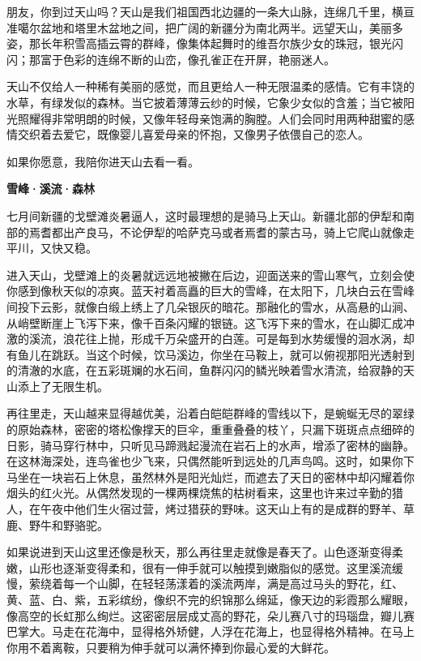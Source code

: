 \documentclass[12pt,UTF-8,openany]{ctexbook}
\begin{document}
\begin{large}
    
    朋友，你到过天山吗？天山是我们祖国西北边疆的一条大山脉，连绵几千里，横亘准噶尔盆地和塔里木盆地之间，把广阔的新疆分为南北两半。远望天山，美丽多姿，那长年积雪高插云霄的群峰，像集体起舞时的维吾尔族少女的珠冠，银光闪闪；那富于色彩的连绵不断的山峦，像孔雀正在开屏，艳丽迷人。
    
    天山不仅给人一种稀有美丽的感觉，而且更给人一种无限温柔的感情。它有丰饶的水草，有绿发似的森林。当它披着薄薄云纱的时候，它象少女似的含羞；当它被阳光照耀得非常明朗的时候，又像年轻母亲饱满的胸膛。人们会同时用两种甜蜜的感情交织着去爱它，既像婴儿喜爱母亲的怀抱，又像男子依偎自己的恋人。
    
    如果你愿意，我陪你进天山去看一看。
    
    \begin{center}
    
    \begin{large}\textbf{雪峰·溪流·森林}\end{large}
    
    \end{center}
    
    七月间新疆的戈壁滩炎暑逼人，这时最理想的是骑马上天山。新疆北部的伊犁和南部的焉耆都出产良马，不论伊犁的哈萨克马或者焉耆的蒙古马，骑上它爬山就像走平川，又快又稳。
    
    进入天山，戈壁滩上的炎暑就远远地被撇在后边，迎面送来的雪山寒气，立刻会使你感到像秋天似的凉爽。蓝天衬着高矗的巨大的雪峰，在太阳下，几块白云在雪峰间投下云影，就像白缎上绣上了几朵银灰的暗花。那融化的雪水，从高悬的山涧、从峭壁断崖上飞泻下来，像千百条闪耀的银链。这飞泻下来的雪水，在山脚汇成冲激的溪流，浪花往上抛，形成千万朵盛开的白莲。可是每到水势缓慢的洄水涡，却有鱼儿在跳跃。当这个时候，饮马溪边，你坐在马鞍上，就可以俯视那阳光透射到的清澈的水底，在五彩斑斓的水石间，鱼群闪闪的鳞光映着雪水清流，给寂静的天山添上了无限生机。
    
    再往里走，天山越来显得越优美，沿着白皑皑群峰的雪线以下，是蜿蜒无尽的翠绿的原始森林，密密的塔松像撑天的巨伞，重重叠叠的枝丫，只漏下斑斑点点细碎的日影，骑马穿行林中，只听见马蹄溅起漫流在岩石上的水声，增添了密林的幽静。在这林海深处，连鸟雀也少飞来，只偶然能听到远处的几声鸟鸣。这时，如果你下马坐在一块岩石上休息，虽然林外是阳光灿烂，而遮去了天日的密林中却闪耀着你烟头的红火光。从偶然发现的一棵两棵烧焦的枯树看来，这里也许来过辛勤的猎人，在午夜中他们生火宿过营，烤过猎获的野味。这天山上有的是成群的野羊、草鹿、野牛和野骆驼。
    
    如果说进到天山这里还像是秋天，那么再往里走就像是春天了。山色逐渐变得柔嫩，山形也逐渐变得柔和，很有一伸手就可以触摸到嫩脂似的感觉。这里溪流缓慢，萦绕着每一个山脚，在轻轻荡漾着的溪流两岸，满是高过马头的野花，红、黄、蓝、白、紫，五彩缤纷，像织不完的织锦那么绵延，像天边的彩霞那么耀眼，像高空的长虹那么绚烂。这密密层层成丈高的野花，朵儿赛八寸的玛瑙盘，瓣儿赛巴掌大。马走在花海中，显得格外矫健，人浮在花海上，也显得格外精神。在马上你用不着离鞍，只要稍为伸手就可以满怀捧到你最心爱的大鲜花。
    

\end{large}
\end{document}
